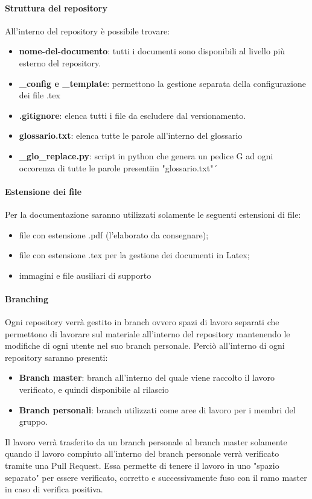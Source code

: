 			\paragraph{Struttura del repository}
			All'interno del repository è possibile trovare:
			\begin{itemize}
				\item \textbf{nome-del-documento}: tutti i documenti sono disponibili al livello più esterno del repository.
				\item \textbf{\_config e \_template}: permettono la gestione separata della configurazione dei file .tex
				\item \textbf{.gitignore}: elenca tutti i file da escludere dal versionamento.
				\item \textbf{glossario.txt}: elenca tutte le parole all'interno del glossario
				\item \textbf{\_glo\_replace.py}: script in python che genera un pedice G ad ogni occorenza di tutte le parole presentiin "glossario.txt"´
			\end{itemize}
			
			\paragraph{Estensione dei file}
			Per la documentazione saranno utilizzati solamente le seguenti estensioni di file:
			\begin{itemize}
				\item file con estensione .pdf (l'elaborato da consegnare);
				\item file con estensione .tex per la gestione dei documenti in Latex;
				\item immagini e file ausiliari di supporto
			\end{itemize}
		
			\paragraph{Branching}
			Ogni repository verrà gestito in branch ovvero spazi di lavoro separati che permettono di lavorare sul materiale all'interno del repository mantenendo le modifiche di ogni utente nel suo branch personale. Perciò all'interno di ogni repository saranno presenti:
			\begin{itemize}
				\item \textbf{Branch master}: branch all'interno del quale viene raccolto il lavoro verificato, e quindi disponibile al rilascio
				\item \textbf{Branch personali}: branch utilizzati come aree di lavoro per i membri del gruppo.
			\end{itemize}
			Il lavoro verrà trasferito da un branch personale al branch master solamente quando il lavoro compiuto all'interno del branch personale verrà verificato tramite una Pull Request. Essa permette di tenere il lavoro in uno "spazio separato" per essere verificato, corretto e successivamente fuso con il ramo master in caso di verifica positiva.
			
